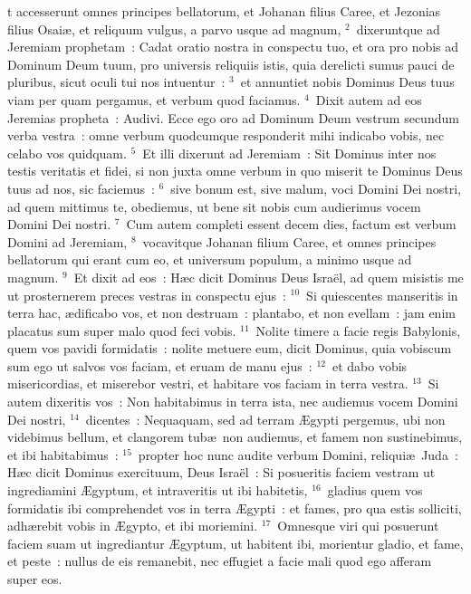 \bchapter
{}t accesserunt omnes principes bellatorum, et Johanan filius Caree, et Jezonias filius Osai\ae , et reliquum vulgus, a parvo usque ad magnum,
${}^{2}$~dixeruntque ad Jeremiam prophetam~: Cadat oratio nostra in conspectu tuo, et ora pro nobis ad Dominum Deum tuum, pro universis reliquiis istis, quia derelicti sumus pauci de pluribus, sicut oculi tui nos intuentur~:
${}^{3}$~et annuntiet nobis Dominus Deus tuus viam per quam pergamus, et verbum quod faciamus.
${}^{4}$~Dixit autem ad eos Jeremias propheta~: Audivi. Ecce ego oro ad Dominum Deum vestrum secundum verba vestra~: omne verbum quodcumque responderit mihi indicabo vobis, nec celabo vos quidquam.
${}^{5}$~Et illi dixerunt ad Jeremiam~: Sit Dominus inter nos testis veritatis et fidei, si non juxta omne verbum in quo miserit te Dominus Deus tuus ad nos, sic faciemus~:
${}^{6}$~sive bonum est, sive malum, voci Domini Dei nostri, ad quem mittimus te, obediemus, ut bene sit nobis cum audierimus vocem Domini Dei nostri.
${}^{7}$~Cum autem completi essent decem dies, factum est verbum Domini ad Jeremiam,
${}^{8}$~vocavitque Johanan filium Caree, et omnes principes bellatorum qui erant cum eo, et universum populum, a minimo usque ad magnum.
${}^{9}$~Et dixit ad eos~: H\ae c dicit Dominus Deus Isra\"el, ad quem misistis me ut prosternerem preces vestras in conspectu ejus~:
${}^{10}$~Si quiescentes manseritis in terra hac, \ae dificabo vos, et non destruam~: plantabo, et non evellam~: jam enim placatus sum super malo quod feci vobis.
${}^{11}$~Nolite timere a facie regis Babylonis, quem vos pavidi formidatis~: nolite metuere eum, dicit Dominus, quia vobiscum sum ego ut salvos vos faciam, et eruam de manu ejus~:
${}^{12}$~et dabo vobis misericordias, et miserebor vestri, et habitare vos faciam in terra vestra.
${}^{13}$~Si autem dixeritis vos~: Non habitabimus in terra ista, nec audiemus vocem Domini Dei nostri,
${}^{14}$~dicentes~: Nequaquam, sed ad terram \AE gypti pergemus, ubi non videbimus bellum, et clangorem tub\ae\ non audiemus, et famem non sustinebimus, et ibi habitabimus~:
${}^{15}$~propter hoc nunc audite verbum Domini, reliqui\ae\ Juda~: H\ae c dicit Dominus exercituum, Deus Isra\"el~: Si posueritis faciem vestram ut ingrediamini \AE gyptum, et intraveritis ut ibi habitetis,
${}^{16}$~gladius quem vos formidatis ibi comprehendet vos in terra \AE gypti~: et fames, pro qua estis solliciti, adh\ae rebit vobis in \AE gypto, et ibi moriemini.
${}^{17}$~Omnesque viri qui posuerunt faciem suam ut ingrediantur \AE gyptum, ut habitent ibi, morientur gladio, et fame, et peste~: nullus de eis remanebit, nec effugiet a facie mali quod ego afferam super eos.
